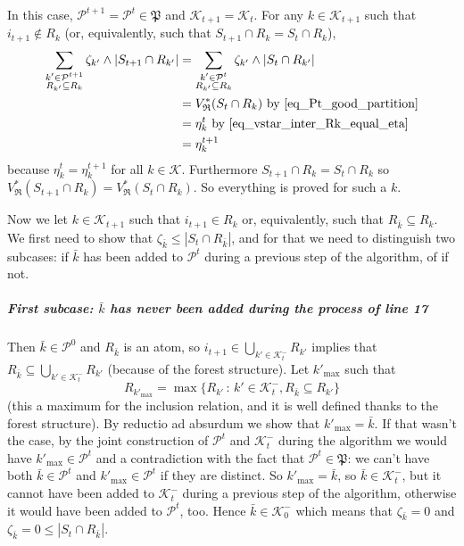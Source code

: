 \documentclass[
  11pt,
  a4paper,
]{article}
\let\oldsubparagraph\subparagraph
\renewcommand{\subparagraph}[1]{\oldsubparagraph{#1}\mbox{}}
\theoremstyle{plain}
\theoremstyle{plain}
\theoremstyle{plain}
\theoremstyle{definition}
\theoremstyle{definition}
\theoremstyle{remark}
\begin{document}
In this case, \(\mathcal{P}^{t+1}=\mathcal{P}^t\in\mathfrak P\) and
\(\mathcal{K}_{t+1}=\mathcal{K}_t\). For any \(k\in\mathcal{K}_{t+1}\)
such that \(i_{t+1}\not\in R_k\) (or, equivalently, such that
\(S_{t+1}\cap R_k=S_t\cap R_k\)), \begin{align*}
\sum_{\substack{k'\in\mathcal{P}^{t+1} \\ R_{k'}\subseteq R_k}} \zeta_{k'}\wedge |S_{t+1}\cap R_{k'}|&=\sum_{\substack{k'\in\mathcal{P}^{t} \\ R_{k'}\subseteq R_k}} \zeta_{k'}\wedge |S_{t}\cap R_{k'}| \\
&=V^*_{\mathfrak{R}}(S_t\cap R_k) \text{ by~\eqref{eq_Pt_good_partition}}\\
&=\eta_k^t \text{ by~\eqref{eq_vstar_inter_Rk_equal_eta}}\\
&=\eta_k^{t+1}
\end{align*} because \(\eta_k^t=\eta_k^{t+1}\) for all
\(k\in\mathcal{K}\). Furthermore \(S_{t+1}\cap R_k=S_t\cap R_k\) so
\(V^*_{\mathfrak{R}}(S_{t+1}\cap R_k)=V^*_{\mathfrak{R}}(S_t\cap R_k)\).
So everything is proved for such a \(k\).

Now we let \(k\in\mathcal{K}_{t+1}\) such that \(i_{t+1}\in R_k\) or,
equivalently, such that \(R_{\bar k}\subseteq R_k\). We first need to
show that \(\zeta_{\bar k}\leq |S_t\cap R_{\bar k}|\), and for that we
need to distinguish two subcases: if \(\bar k\) has been added to
\(\mathcal{P}^t\) during a previous step of the algorithm, of if not.

\subparagraph{\texorpdfstring{First subcase: \(\bar k\) has never been
added during the process of line
17}{First subcase: \textbackslash bar k has never been added during the process of line 17}}\label{first-subcase-bar-k-has-never-been-added-during-the-process-of-line-17}

Then \(\bar k\in\mathcal{P}^0\) and \(R_{\bar k}\) is an atom, so
\(i_{t+1}\in\bigcup_{k'\in\mathcal{K}^-_{t}}R_{k'}\) implies that
\(R_{\bar k}\subseteq \bigcup_{k'\in\mathcal{K}^-_{t}}R_{k'}\) (because
of the forest structure). Let \(k'_{\max}\) such that \begin{equation*}
R_{k'_{\max}}=\max\{ R_{k'}\,:\,k'\in\mathcal{K}^-_t, R_{\bar k}\subseteq R_{k'}  \}
\end{equation*} (this a maximum for the inclusion relation, and it is
well defined thanks to the forest structure). By reductio ad absurdum we
show that \(k'_{\max}=\bar k\). If that wasn't the case, by the joint
construction of \(\mathcal{P}^t\) and \(\mathcal{K}^-_t\) during the
algorithm we would have \(k'_{\max}\in\mathcal{P}^t\) and a
contradiction with the fact that \(\mathcal{P}^t\in\mathfrak P\): we
can't have both \(\bar k\in\mathcal{P}^t\) and
\(k'_{\max}\in\mathcal{P}^t\) if they are distinct. So
\(k'_{\max}=\bar k\), so \(\bar k\in  \mathcal{K}^-_t\), but it cannot
have been added to \(\mathcal{K}^-_t\) during a previous step of the
algorithm, otherwise it would have been added to \(\mathcal{P}^t\), too.
Hence \(\bar k\in \mathcal{K}^-_0\) which means that
\(\zeta_{\bar k}=0\) and \(\zeta_{\bar k}=0\leq |S_t\cap R_{\bar k}|\).
\end{document}
